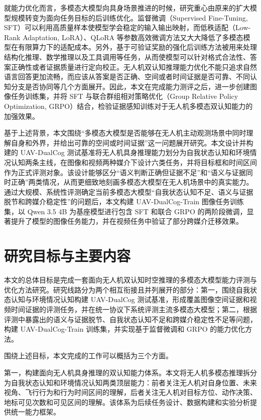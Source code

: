 就能力优化而言，多模态大模型向具身场景推进的时候，研究重心由原来的扩大模型规模转变为面向任务目标的后训练优化。监督微调（Supervised Fine-Tuning, SFT）可以利用高质量样本使模型学会稳定的输入输出映射，而低秩适配（Low-Rank Adaptation, LoRA）、QLoRA 等参数高效微调方法又大大降低了多模态模型在有限算力下的适配成本。另外，基于可验证奖励的强化后训练方法被用来处理结构化推理、数学推理以及工具调用等任务，从而使模型可以针对格式合法性、答案正确性或者证据质量进行定向校正。无人机双认知推理能力优化不能只追求自然语言回答更加流畅，而应该从答案是否正确、空间或者时间证据是否可靠、不同认知分支是否协同等几个方面展开。因此，本文在完成能力测评之后，进一步创建图像任务训练集，并将 SFT 与联合群组相对策略优化（Group Relative Policy Optimization, GRPO）结合，检验证据感知训练对于无人机多模态双认知能力的加强效果。

基于上述背景，本文围绕“多模态大模型是否能够在无人机主动观测场景中同时理解自身和外界，并给出可靠的空间或时间证据”这一问题展开研究。本文设计并构建的 UAV-DualCog 测试基准将无人机具身推理能力划分为自我状态认知和环境情况认知两条主线，在图像和视频两种媒介下设计六类任务，并将目标框和时间区间作为正式评测对象。该设计能够区分“语义判断正确但证据不足”和“语义与证据同时正确”两类情况，从而更细致地刻画多模态大模型在无人机场景中的真实能力。通过大规模、系统性评测确定当前多模态大模型“自我状态认知不足、语义与证据脱节和跨媒介稳定性”的问题后，本文构建 UAV-DualCog-Train 图像任务训练集，以 Qwen 3.5 4B 为基座模型进行包含 SFT 和联合 GRPO 的两阶段微调，显著提升了模型的图像任务能力，并在视频任务中验证了部分跨媒介迁移效果。

\section{研究目标与主要内容}

本文的总体目标是完成一套面向无人机双认知时空推理的多模态大模型能力评测与优化方法研究。研究线路分为两个相互衔接且并列展开的部分：第一，围绕自我状态认知与环境情况认知构建 UAV-DualCog 测试基准，形成覆盖图像空间证据和视频时间证据的评测任务，并在统一协议下系统评测主流多模态大模型；第二，根据评测中暴露出的语义与证据脱节、自我状态认知不足和跨媒介稳定性不足等问题，构建 UAV-DualCog-Train 训练集，并实现基于监督微调和 GRPO 的能力优化方法。

围绕上述目标，本文完成的工作可以概括为三个方面。

第一，构建面向无人机具身推理的双认知能力体系。本文将无人机多模态推理拆分为自我状态认知和环境情况认知两类顶层能力：前者关注无人机对自身位置、未来视角、飞行行为和行为时间区间的理解，后者关注无人机对目标方位、动作决策、地标可见次数和可见区间的理解。该体系为后续任务设计、数据构建和实验分析提供统一能力框架。

